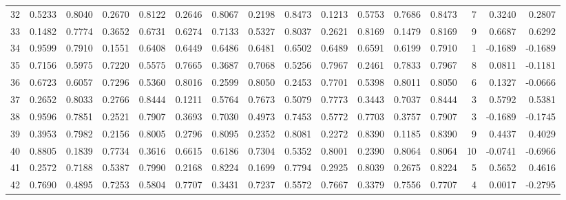 \begin{tabular}{lrrrrrrrrrrrrrrr}
32  &      0.5233 &  0.8040 &  0.2670 &  0.8122 &  0.2646 &  0.8067 &  0.2198 &  0.8473 &  0.1213 &  0.5753 &   0.7686 &     0.8473 &      7 &                    0.3240 &                     0.2807 \\
33  &      0.1482 &  0.7774 &  0.3652 &  0.6731 &  0.6274 &  0.7133 &  0.5327 &  0.8037 &  0.2621 &  0.8169 &   0.1479 &     0.8169 &      9 &                    0.6687 &                     0.6292 \\
34  &      0.9599 &  0.7910 &  0.1551 &  0.6408 &  0.6449 &  0.6486 &  0.6481 &  0.6502 &  0.6489 &  0.6591 &   0.6199 &     0.7910 &      1 &                   -0.1689 &                    -0.1689 \\
35  &      0.7156 &  0.5975 &  0.7220 &  0.5575 &  0.7665 &  0.3687 &  0.7068 &  0.5256 &  0.7967 &  0.2461 &   0.7833 &     0.7967 &      8 &                    0.0811 &                    -0.1181 \\
36  &      0.6723 &  0.6057 &  0.7296 &  0.5360 &  0.8016 &  0.2599 &  0.8050 &  0.2453 &  0.7701 &  0.5398 &   0.8011 &     0.8050 &      6 &                    0.1327 &                    -0.0666 \\
37  &      0.2652 &  0.8033 &  0.2766 &  0.8444 &  0.1211 &  0.5764 &  0.7673 &  0.5079 &  0.7773 &  0.3443 &   0.7037 &     0.8444 &      3 &                    0.5792 &                     0.5381 \\
38  &      0.9596 &  0.7851 &  0.2521 &  0.7907 &  0.3693 &  0.7030 &  0.4973 &  0.7453 &  0.5772 &  0.7703 &   0.3757 &     0.7907 &      3 &                   -0.1689 &                    -0.1745 \\
39  &      0.3953 &  0.7982 &  0.2156 &  0.8005 &  0.2796 &  0.8095 &  0.2352 &  0.8081 &  0.2272 &  0.8390 &   0.1185 &     0.8390 &      9 &                    0.4437 &                     0.4029 \\
40  &      0.8805 &  0.1839 &  0.7734 &  0.3616 &  0.6615 &  0.6186 &  0.7304 &  0.5352 &  0.8001 &  0.2390 &   0.8064 &     0.8064 &     10 &                   -0.0741 &                    -0.6966 \\
41  &      0.2572 &  0.7188 &  0.5387 &  0.7990 &  0.2168 &  0.8224 &  0.1699 &  0.7794 &  0.2925 &  0.8039 &   0.2675 &     0.8224 &      5 &                    0.5652 &                     0.4616 \\
42  &      0.7690 &  0.4895 &  0.7253 &  0.5804 &  0.7707 &  0.3431 &  0.7237 &  0.5572 &  0.7667 &  0.3379 &   0.7556 &     0.7707 &      4 &                    0.0017 &                    -0.2795 \\

\end{tabular}
